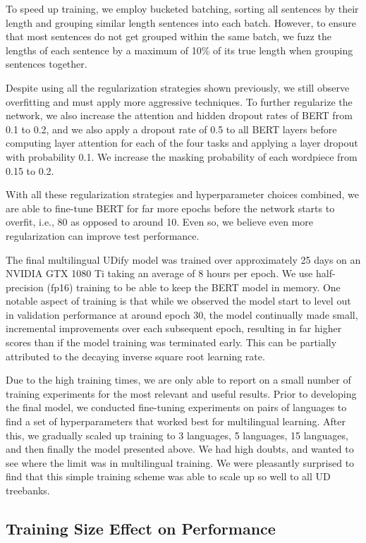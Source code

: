 \documentclass[11pt,a4paper]{article}
\begin{document}
To speed up training, we employ bucketed batching, sorting all sentences by their length and grouping similar length sentences into each batch.
However, to ensure that most sentences do not get grouped within the same batch, we fuzz the lengths of each sentence by a maximum of 10\% of its true length when grouping sentences together.

Despite using all the regularization strategies shown previously, we still observe overfitting and must apply more aggressive techniques.
To further regularize the network, we also increase the attention and hidden dropout rates of BERT from 0.1 to 0.2, and we also apply a dropout rate of 0.5 to all BERT layers before computing layer attention for each of the four tasks and applying a layer dropout with probability 0.1.
We increase the masking probability of each wordpiece from 0.15 to 0.2.

With all these regularization strategies and hyperparameter choices combined, we are able to fine-tune BERT for far more epochs before the network starts to overfit, i.e., 80 as opposed to around 10. Even so, we believe even more regularization can improve test performance.

The final multilingual UDify model was trained over approximately 25 days on an NVIDIA GTX 1080 Ti taking an average of 8 hours per epoch.
We use half-precision (fp16) training to be able to keep the BERT model in memory.
One notable aspect of training is that while we observed the model start to level out in validation performance at around epoch 30, the model continually made small, incremental improvements over each subsequent epoch, resulting in far higher scores than if the model training was terminated early. This can be partially attributed to the decaying inverse square root learning rate.

Due to the high training times, we are only able to report on a small number of training experiments for the most relevant and useful results. Prior to developing the final model, we conducted fine-tuning experiments on pairs of languages to find a set of hyperparameters that worked best for multilingual learning.
After this, we gradually scaled up training to 3 languages, 5 languages, 15 languages, and then finally the model presented above. We had high doubts, and wanted to see where the limit was in multilingual training.
We were pleasantly surprised to find that this simple training scheme was able to scale up so well to all UD treebanks.

\subsection{Training Size Effect on Performance}
\end{document}
